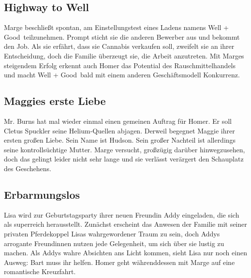 
\subsection{Highway to Well}
Marge beschließt spontan, am Einstellungstest eines Ladens namens \glqq Well + Good\grqq\ teilzunehmen. Prompt sticht sie die anderen Bewerber aus und bekommt den Job. Als sie erfährt, dass sie Cannabis verkaufen soll, zweifelt sie an ihrer Entscheidung, doch die Familie überzeugt sie, die Arbeit anzutreten. Mit Marges steigendem Erfolg erkennt auch Homer das Potential des Rauschmittelhandels und macht \glqq Well + Good\grqq\ bald mit einem anderen Geschäftsmodell Konkurrenz.


\subsection{Maggies erste Liebe}\label{YABF13}
Mr. Burns hat mal wieder einmal einen gemeinen Auftrag für Homer. Er soll Cletus Spuckler seine Helium-Quellen abjagen. Derweil begegnet Maggie ihrer ersten großen Liebe. Sein Name ist Hudson. Sein großer Nachteil ist allerdings seine kontrollsüchtige Mutter. Marge versucht, großzügig darüber hinwegzusehen, doch das gelingt leider nicht sehr lange und sie verlässt verärgert den Schauplatz des Geschehens.


\subsection{Erbarmungslos}
Lisa wird zur Geburtstagsparty ihrer neuen Freundin Addy eingeladen, die sich als superreich herausstellt. Zunächst erscheint das Anwesen der Familie mit seiner privaten Pferdekoppel Lisas wahrgewordener Traum zu sein, doch Addys arrogante Freundinnen nutzen jede Gelegenheit, um sich über sie lustig zu machen. Als Addys wahre Absichten ans Licht kommen, sieht Lisa nur noch einen Ausweg: Bart muss ihr helfen. Homer geht währenddessen mit Marge auf eine romantische Kreuzfahrt.

